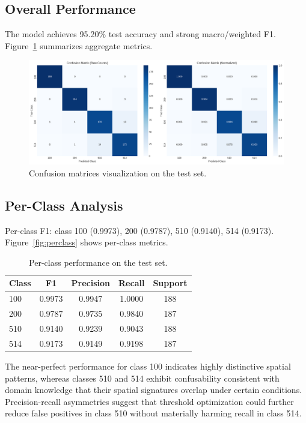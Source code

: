 \documentclass[11pt,a4paper]{article}
\begin{document}
\subsection{Overall Performance}
The model achieves 95.20\% test accuracy and strong macro/weighted F1. Figure~\ref{fig:overall} summarizes aggregate metrics.

\begin{figure}[H]
  \centering
  \includegraphics[width=.85\linewidth]{images/confusion_matrices.png}
  \caption{Confusion matrices visualization on the test set.}
  \label{fig:overall}
\end{figure}

\subsection{Per-Class Analysis}
Per-class F1: class 100 (0.9973), 200 (0.9787), 510 (0.9140), 514 (0.9173). Figure~\ref{fig:perclass} shows per-class metrics.

\begin{table}[H]
\centering
\caption{Per-class performance on the test set.}
\begin{tabular}{lcccc}
\toprule
Class & F1 & Precision & Recall & Support \\
\midrule
100 & 0.9973 & 0.9947 & 1.0000 & 188 \\
200 & 0.9787 & 0.9735 & 0.9840 & 187 \\
510 & 0.9140 & 0.9239 & 0.9043 & 188 \\
514 & 0.9173 & 0.9149 & 0.9198 & 187 \\
\bottomrule
\end{tabular}
\end{table}

The near-perfect performance for class 100 indicates highly distinctive spatial patterns, whereas classes 510 and 514 exhibit confusability consistent with domain knowledge that their spatial signatures overlap under certain conditions. Precision-recall asymmetries suggest that threshold optimization could further reduce false positives in class 510 without materially harming recall in class 514.
\end{document}

